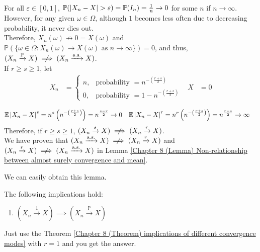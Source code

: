 \documentclass{huhtakm-template-book}
\newcommand{\prob}{\mathbb{P}}
\newcommand{\expect}{\mathbb{E}}
\begin{document}
\begin{proofing}
\begin{enumerate}
\begin{align*}
		\end{align*}
		For all $\varepsilon\in[0,1]$, $\prob(\abs{X_{n}-X}>\varepsilon)=\prob(I_{n})=\frac{1}{n}\to 0$ for some $n$ if $n\to\infty$.\\
		However, for any given $\omega\in\Omega$, although $1$ becomes less often due to decreasing probability, it never dies out.\\
		Therefore, $X_{n}(\omega)\not\to 0=X(\omega)$ and $\prob(\{\omega\in\Omega:X_{n}(\omega)\to X(\omega)\text{ as }n\to\infty\})=0$, and thus, $(X_{n}\xrightarrow{\prob}X)\centernot\implies(X_{n}\xrightarrow{\text{a.s.}}X)$.\\
		If $r\geq s\geq 1$, let
		\begin{align*}
			X_{n}&=\begin{cases}
				n, &\text{probability }=n^{-\left(\frac{r+s}{2}\right)}\\
				0, &\text{probability }=1-n^{-\left(\frac{r+s}{2}\right)}
			\end{cases} & X&=0
		\end{align*}
		
		\begin{align*}
			\expect\abs{X_{n}-X}^{s}&=n^{s}\left(n^{-\left(\frac{r+s}{2}\right)}\right)=n^{\frac{s-r}{2}}\to 0 & \expect\abs{X_{n}-X}^{r}&=n^{r}\left(n^{-\left(\frac{r+s}{2}\right)}\right)=n^{\frac{r-s}{2}}\to\infty
		\end{align*}
		Therefore, if $r\geq s\geq 1$, $(X_{n}\xrightarrow{s}X)\centernot\implies(X_{n}\xrightarrow{r}X)$.\\
		We have proven that $(X_{n}\xrightarrow{\text{a.s.}}X)\centernot\implies(X_{n}\xrightarrow{r}X)$ and $(X_{n}\xrightarrow{r}X)\centernot\implies(X_{n}\xrightarrow{\text{a.s.}}X)$ in Lemma \ref{Chapter 8 (Lemma) Non-relationship between almost surely convergence and mean}.
	\end{enumerate}
\end{proofing}
We can easily obtain this lemma.
\begin{lem}
	The following implications hold:
	\begin{enumerate}
		\item $(X_{n}\xrightarrow{1}X)\implies(X_{n}\xrightarrow{\prob}X)$
	\end{enumerate}
\end{lem}
\begin{proofing}
	Just use the Theorem \ref{Chapter 8 (Theorem) implications of different convergence modes} with $r=1$ and you get the answer.
\end{proofing}
\end{document}
